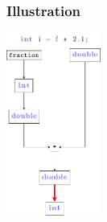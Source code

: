 \begin{frame}
\frametitle{Illustration}
\begin{center}
\includegraphics[height=6cm]{pics/conv-3.pdf}
\end{center}
\end{frame}



